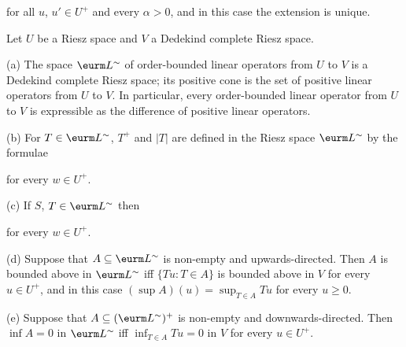 
\noindent for all $u$, $u'\in U^+$ and every $\alpha>0$, and in this
case the extension is unique.


  Let $U$ be a Riesz space and $V$ a Dedekind
complete Riesz space.

(a) The space $\eurm L^{\sim}$ of
order-bounded linear operators from $U$ to $V$ is a Dedekind complete
Riesz space;  its positive cone is the set of positive linear operators
from $U$ to $V$.   In particular, every order-bounded linear operator
from $U$ to $V$ is expressible as the difference of positive linear
operators.


(b) For $T\in\eurm L^{\sim}$, $T^+$ and $|T|$ are defined in the Riesz
space $\eurm L^{\sim}$ by the formulae



\noindent for every $w\in U^+$.

(c) If $S$, $T\in\eurm L^{\sim}$ then


\noindent for every $w\in U^+$.

(d) Suppose that $A\subseteq \eurm L^{\sim}$ is non-empty and
upwards-directed.   Then $A$ is bounded above in $\eurm L^{\sim}$ iff
$\{Tu:T\in A\}$ is bounded above in $V$ for every $u\in U^+$, and in
this case $(\sup A)(u)=\sup_{T\in A}Tu$ for every $u\ge 0$.

(e) Suppose that $A\subseteq(\eurm L^{\sim})^+$ is non-empty and
downwards-directed.   Then $\inf A=0$ in $\eurm L^{\sim}$ iff
$\inf_{T\in A}Tu=0$ in $V$ for every $u\in U^+$.


